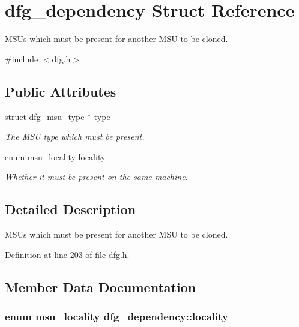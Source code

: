 \hypertarget{structdfg__dependency}{\section{dfg\-\_\-dependency Struct Reference}
\label{structdfg__dependency}
}


M\-S\-Us which must be present for another M\-S\-U to be cloned.  




{\ttfamily \#include $<$dfg.\-h$>$}

\subsection*{Public Attributes}
\begin{DoxyCompactItemize}
\item 
struct \hyperlink{structdfg__msu__type}{dfg\-\_\-msu\-\_\-type} $\ast$ \hyperlink{structdfg__dependency_a0aa6bde8bdcb9cbf14d8ceb86552af21}{type}
\begin{DoxyCompactList}\small\item\em The M\-S\-U type which must be present. \end{DoxyCompactList}\item 
enum \hyperlink{dfg_8h_a97b014aefcfb738ba60c39a3bbd44c31}{msu\-\_\-locality} \hyperlink{structdfg__dependency_a76baa564596b3c787f536a3373113827}{locality}
\begin{DoxyCompactList}\small\item\em Whether it must be present on the same machine. \end{DoxyCompactList}\end{DoxyCompactItemize}


\subsection{Detailed Description}
M\-S\-Us which must be present for another M\-S\-U to be cloned. 

Definition at line 203 of file dfg.\-h.



\subsection{Member Data Documentation}
\hypertarget{structdfg__dependency_a76baa564596b3c787f536a3373113827}{
\subsubsection[{locality}]{\setlength{\rightskip}{0pt plus 5cm}enum {\bf msu\-\_\-locality} dfg\-\_\-dependency\-::locality}}\label{structdfg__dependency_a76baa564596b3c787f536a3373113827}


